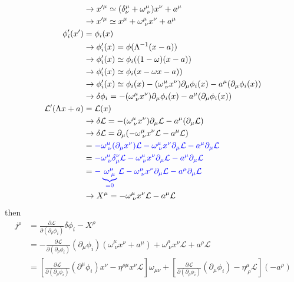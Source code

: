 \documentclass[10pt,a4paper]{report}
\theoremstyle{definition}
\begin{document}
\begin{enumerate}[a)]
\begin{align}
&\rightarrow x'^\mu\simeq(\delta^\mu_\nu+\omega^\mu_{\;\nu})x^\nu+a^\mu\\
&\rightarrow x'^\mu\simeq x^\mu+\omega^\mu_{\;\nu}x^\nu+a^\mu\\
\phi_i'(x')&=\phi_i(x)\\
&\rightarrow\phi_i'(x)=\phi(\Lambda^{-1}(x-a))\\
&\rightarrow\phi_i'(x)\simeq\phi_i((1-\omega)(x-a))\\
&\rightarrow\phi_i'(x)\simeq\phi_i(x-\omega x-a))\\
&\rightarrow\phi_i'(x)\simeq\phi_i(x)-(\omega^\mu_{\;\nu} x^\nu)\partial_\mu\phi_i(x)-a^\mu(\partial_\mu\phi_i(x))\\
&\rightarrow\delta\phi_i=-(\omega^\mu_{\;\nu} x^\nu)\partial_\mu\phi_i(x)-a^\mu(\partial_\mu\phi_i(x))\\
\mathcal{L}'(\Lambda x+a)&=\mathcal{L}(x)\\
&\rightarrow\delta\mathcal{L}=-(\omega^\mu_{\;\nu} x^\nu)\partial_\mu\mathcal{L}-a^\mu(\partial_\mu\mathcal{L})\\
&\rightarrow\delta\mathcal{L}=\partial_\mu(-\omega^\mu_{\;\nu} x^\nu\mathcal{L}-a^\mu \mathcal{L})\\
&=\textcolor{blue}{-\omega^\mu_{\;\nu} (\partial_\mu x^\nu)\mathcal{L}-\omega^\mu_{\;\nu}x^\nu \partial_\mu\mathcal{L}-a^\mu \partial_\mu\mathcal{L}}\\
&=\textcolor{blue}{-\omega^\mu_{\;\nu} \delta_\mu^\nu\mathcal{L}-\omega^\mu_{\;\nu}x^\nu \partial_\mu\mathcal{L}-a^\mu \partial_\mu\mathcal{L}}\\
&=\textcolor{blue}{-\underbrace{\omega^\mu_{\;\mu}}_{=0}\mathcal{L}-\omega^\mu_{\;\nu}x^\nu \partial_\mu\mathcal{L}-a^\mu \partial_\mu\mathcal{L}}\\
&\rightarrow X^\mu=-\omega^\mu_{\;\nu} x^\nu\mathcal{L}-a^\mu \mathcal{L}\\
\end{align}
then
\begin{align}
j^\rho
&=\frac{\partial\mathcal{L}}{\partial(\partial_\rho\phi_i)}\delta\phi_i-X^\rho\\
&=-\frac{\partial\mathcal{L}}{\partial(\partial_\rho\phi_i)}(\partial_\mu\phi_i)(\omega^\mu_{\;\nu} x^\nu+a^\mu)+\omega^\rho_{\;\nu} x^\nu\mathcal{L}+a^\rho \mathcal{L}\\
&=\left[\frac{\partial\mathcal{L}}{\partial(\partial_\rho\phi_i)}(\partial^\mu\phi_i) x^\nu-\eta^{\rho\mu} x^\nu\mathcal{L}\right]\omega_{\mu\nu}+\left[\frac{\partial\mathcal{L}}{\partial(\partial_\rho\phi_i)}(\partial_\mu\phi_i)-\eta^\mu_{\;\rho}\mathcal{L}\right](-a^\rho)

\end{align}
\end{enumerate}
\end{document}
